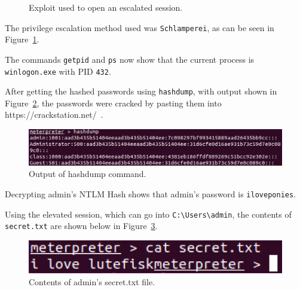 \documentclass[11pt]{article}
\begin{document}
\begin{description}
\begin{figure}[htbp]
      \caption{Exploit used to open an escalated session.}
      \label{fig:esc_exploit}
    \end{figure}
  \item[3-18.] The privilege escalation method used was \verb|Schlamperei|, as can be seen in Figure~\ref{fig:esc_exploit}.
  \item[3-19.] The commands \verb|getpid| and \verb|ps| now show that the current process is \verb|winlogon.exe| with PID \verb|432|.
  \item[3-20.] After getting the hashed passwords using \verb|hashdump|, with output shown in Figure~\ref{fig:hashdump}, the passwords
    were cracked by pasting them into https://crackstation.net/~\cite{crack}.
    \begin{figure}[htbp]
      \centering
      \includegraphics[width=1\linewidth]{./hashdump.png}
      \caption{Output of hashdump command.}
      \label{fig:hashdump}
    \end{figure}
  \item[3-21.] Decrypting admin's NTLM Hash shows that admin's password is \verb|iloveponies|.
  \item[3-22.] Using the elevated session, which can go into \verb|C:\Users\admin|, the contents of \verb|secret.txt| are shown
    below in Figure~\ref{fig:secret}.
    \begin{figure}[htbp]
      \centering
      \includegraphics[width=.6\linewidth]{./secret.png}
      \caption{Contents of admin's secret.txt file.}
      \label{fig:secret}
    \end{figure}
\end{description}


\end{document}
